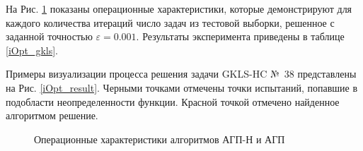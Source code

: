 \documentclass[a4paper,12pt,russian]{article}
\begin{document}
На Рис. \ref{oper_charact} показаны операционные характеристики, которые демонстрируют для каждого количества итераций число задач из тестовой выборки, решенное с заданной точностью $\varepsilon = 0.001$. Результаты эксперимента приведены в таблице \ref{iOpt_gkls}. 

Примеры визуализации процесса решения задачи GKLS-HC №~38 представлены на Рис. \ref{iOpt_result}. Черными точками отмечены точки испытаний, попавшие в подобласти неопределенности функции. Красной точкой отмечено найденное алгоритмом решение.

\begin{figure}[h!]
	\caption{Операционные характеристики алгоритмов АГП-Н и АГП}
	\label{oper_charact}
\end{figure}

\end{document}
